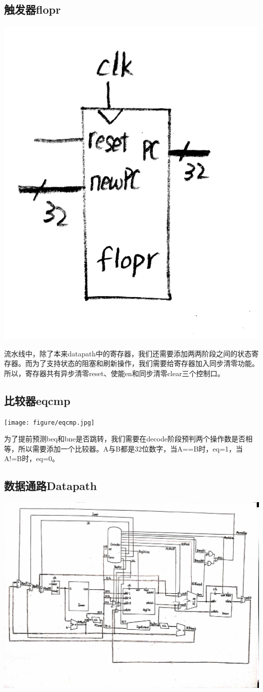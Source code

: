 \documentclass[12pt]{article} %
\begin{document}
\begin{sloppypar}
\subsection{触发器flopr}

\includegraphics[width =0.35\linewidth]{figure/flopr.jpg}

流水线中，除了本来datapath中的寄存器，我们还需要添加两两阶段之间的状态寄存器。而为了支持状态的阻塞和刷新操作，我们需要给寄存器加入同步清零功能。所以，寄存器共有异步清零reset、使能en和同步清零clear三个控制口。

\subsection{比较器eqcmp}

\texttt{[image: figure/eqcmp.jpg]}

为了提前预测beq和bne是否跳转，我们需要在decode阶段预判两个操作数是否相等，所以需要添加一个比较器。A与B都是32位数字，当A==B时，eq=1，当A!=B时，eq=0。


\subsection{数据通路Datapath}
\noindent
\includegraphics[width =\linewidth]{figure/Datapath.jpg}


\end{sloppypar}
\end{document}
